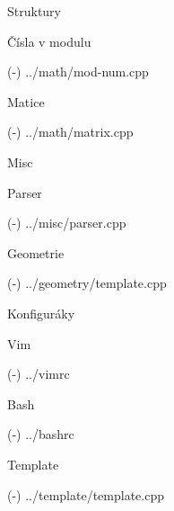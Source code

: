 \sec Struktury 

\secc Čísla v modulu 

\verbinput (-) ../math/mod-num.cpp

\secc Matice 

\verbinput (-) ../math/matrix.cpp

\newpage

\chap Misc

\sec Parser 

\verbinput (-) ../misc/parser.cpp

\newpage

\chap Geometrie

\verbinput (-) ../geometry/template.cpp

\newpage

\chap Konfiguráky

\sec Vim 

\verbinput (-) ../vimrc

\sec Bash 

\verbinput (-) ../bashrc

\sec Template 

\verbinput (-) ../template/template.cpp

\bye
